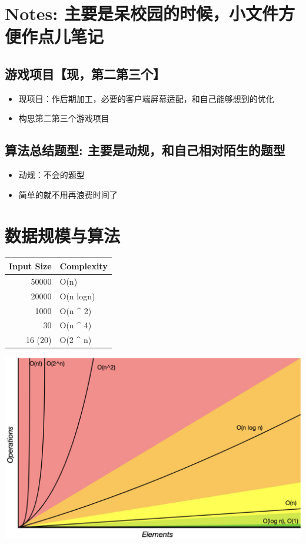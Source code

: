 \documentclass[9pt, b5paper]{article}
\author{deepwaterooo}
\date{\today}
\title{}
\begin{document}
\tableofcontents


\section{Notes: 主要是呆校园的时候，小文件方便作点儿笔记}
\label{sec:org4670664}
\subsection{游戏项目【现，第二第三个】}
\label{sec:orgb2e571a}
\begin{itemize}
\item 现项目：作后期加工，必要的客户端屏幕适配，和自己能够想到的优化
\item 构思第二第三个游戏项目
\end{itemize}

\subsection{算法总结题型: 主要是动规，和自己相对陌生的题型}
\label{sec:org4c5bd4b}
\begin{itemize}
\item 动规：不会的题型
\item 简单的就不用再浪费时间了
\end{itemize}

\section{数据规模与算法}
\label{sec:org48a8257}
\begin{center}
\begin{tabular}{rl}
\hline
Input Size & Complexity\\
\hline
50000 & O(n)\\
20000 & O(n logn)\\
\hline
1000 & O(n \^{} 2)\\
30 & O(n \^{} 4)\\
16 (20) & O(2 \^{} n)\\
\hline
\end{tabular}
\end{center}


\begin{center}
\includegraphics[width=.9\linewidth]{./pic/bigo.jpeg}
\end{center}
\end{document}

